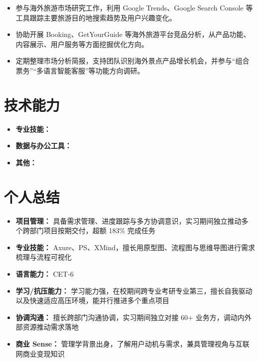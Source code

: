 \documentclass{resume}
\begin{document}
\begin{itemize}

\item 参与海外旅游市场研究工作，利用 Google Trends、Google Search Console 等工具跟踪主要旅游目的地搜索趋势及用户兴趣变化。

\item 协助开展 Booking、GetYourGuide 等海外旅游平台竞品分析，从产品功能、内容展示、用户服务等方面挖掘优化方向。

\item 定期整理市场分析简报，支持团队识别海外景点产品增长机会，并参与“组合票务”“多语言智能客服”等功能方向调研。

\end{itemize}

\section[技术能力]{技术能力}

\begin{itemize}
  \item \textbf{专业技能：}
  \item \textbf{数据与办公工具：}
  \item \textbf{其他：}
\end{itemize}

\section[个人总结]{个人总结}

\begin{itemize}
  \item \textbf{项目管理：} 具备需求管理、进度跟踪与多方协调意识，实习期间独立推动多个跨部门项目按期交付，超额 183\% 完成任务
  \item \textbf{专业技能：} Axure、PS、XMind，擅长用原型图、流程图与思维导图进行需求梳理与流程可视化
  \item \textbf{语言能力：} CET-6
  \item \textbf{学习/抗压能力：} 学习能力强，在校期间跨专业考研专业第三，擅长自我驱动以及快速适应高压环境，能并行推进多个重点项目
  \item \textbf{协调沟通：} 擅长跨部门沟通协调，实习期间独立对接 60+ 业务方，调动内外部资源推动需求落地
  \item \textbf{商业 Sense：} 管理学背景出身，了解用户动机与需求，兼具管理视角与互联网商业变现知识
\end{itemize}
\end{document}
